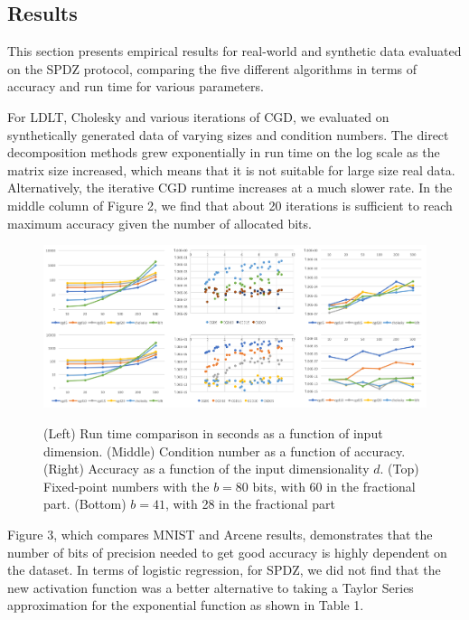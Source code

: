 \documentclass{article}
\begin{document}
\subsection{Results}

This section presents empirical results for real-world and synthetic data evaluated on the SPDZ protocol, comparing the five different algorithms in terms of accuracy and run time for various parameters. 

For LDLT, Cholesky and various iterations of CGD, we evaluated on synthetically generated data of varying sizes and condition numbers. The direct decomposition methods grew exponentially in run time on the log scale as the matrix size increased, which means that it is not suitable for large size real data. Alternatively, the iterative CGD runtime increases at a much slower rate. In the middle column of Figure 2, we find that about 20 iterations is sufficient to reach maximum accuracy given the number of allocated bits. 

\begin{figure}
\centering
  \includegraphics[scale=0.4]{allregression.png}
  \label{fig:result4}
    \caption{(Left) Run time comparison in seconds as a function of input dimension. (Middle) Condition number as a function of accuracy. (Right) Accuracy as a function of the input dimensionality $d$. (Top) Fixed-point numbers with the $b = 80$ bits, with 60 in the fractional part. (Bottom) $b = 41$, with 28 in the fractional part}
\end{figure}

Figure 3, which compares MNIST and Arcene results, demonstrates that the number of bits of precision needed to get good accuracy is highly dependent on the dataset. In terms of logistic regression, for SPDZ, we did not find that the new activation function was a better alternative to taking a Taylor Series approximation for the exponential function as shown in Table 1. 
\end{document}
